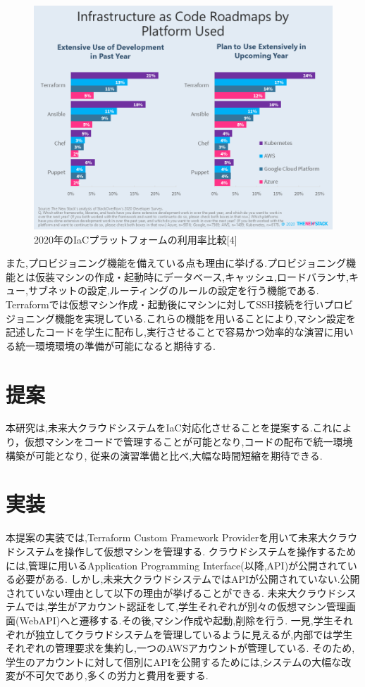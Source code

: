 \documentclass[11pt]{ujarticle}\sloppy
\begin{document}
\begin{figure}[h]
	\includegraphics[width=1\linewidth]{./images/terraform.png}
	\caption{2020年のIaCプラットフォームの利用率比較[4]}
  \label{fig:terraform}
\end{figure}


また,プロビジョニング機能を備えている点も理由に挙げる.プロビジョニング機能とは仮装マシンの作成・起動時にデータベース,キャッシュ,ロードバランサ,キュー,サブネットの設定,ルーティングのルールの設定を行う機能である.
Terraformでは仮想マシン作成・起動後にマシンに対してSSH接続を行いプロビジョニング機能を実現している.これらの機能を用いることにより,マシン設定を記述したコードを学生に配布し,実行させることで容易かつ効率的な演習に用いる統一環境環境の準備が可能になると期待する.

\section{提案}


本研究は,未来大クラウドシステムをIaC対応化させることを提案する.これにより，仮想マシンをコードで管理することが可能となり,コードの配布で統一環境構築が可能となり,
従来の演習準備と比べ,大幅な時間短縮を期待できる.


\section{実装}

本提案の実装では,Terraform Custom Framework Providerを用いて未来大クラウドシステムを操作して仮想マシンを管理する.
クラウドシステムを操作するためには,管理に用いるApplication Programming Interface(以降,API)が公開されている必要がある.
しかし,未来大クラウドシステムではAPIが公開されていない.公開されていない理由として以下の理由が挙げることができる.
未来大クラウドシステムでは,学生がアカウント認証をして,学生それぞれが別々の仮想マシン管理画面(WebAPI)へと遷移する.その後,マシン作成や起動,削除を行う.
一見,学生それぞれが独立してクラウドシステムを管理しているように見えるが,内部では学生それぞれの管理要求を集約し,一つのAWSアカウントが管理している.
そのため,学生のアカウントに対して個別にAPIを公開するためには,システムの大幅な改変が不可欠であり,多くの労力と費用を要する.
\end{document}
